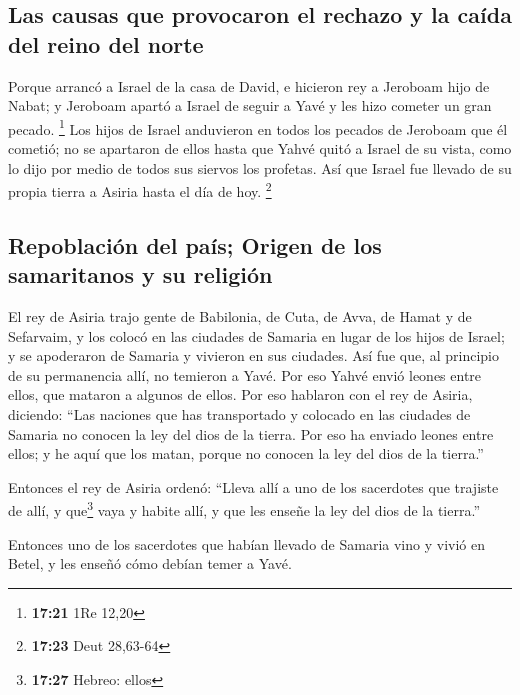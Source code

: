 \begin{paracol}{2}
\hypertarget{las-causas-que-provocaron-el-rechazo-y-la-cauxedda-del-reino-del-norte}{%
\subsection{Las causas que provocaron el rechazo y la caída del reino
del
norte}\label{las-causas-que-provocaron-el-rechazo-y-la-cauxedda-del-reino-del-norte}}

 Porque arrancó a Israel de la casa de David, e hicieron
rey a Jeroboam hijo de Nabat; y Jeroboam apartó a Israel de seguir a
Yavé y les hizo cometer un gran pecado. \footnote{\textbf{17:21} 1Re
  12,20}  Los hijos de Israel anduvieron en todos los
pecados de Jeroboam que él cometió; no se apartaron de ellos
 hasta que Yahvé quitó a Israel de su vista, como lo dijo
por medio de todos sus siervos los profetas. Así que Israel fue llevado
de su propia tierra a Asiria hasta el día de hoy. \footnote{\textbf{17:23}
  Deut 28,63-64}

\hypertarget{repoblaciuxf3n-del-pauxeds-origen-de-los-samaritanos-y-su-religiuxf3n}{%
\subsection{Repoblación del país; Origen de los samaritanos y su
religión}\label{repoblaciuxf3n-del-pauxeds-origen-de-los-samaritanos-y-su-religiuxf3n}}

 El rey de Asiria trajo gente de Babilonia, de Cuta, de
Avva, de Hamat y de Sefarvaim, y los colocó en las ciudades de Samaria
en lugar de los hijos de Israel; y se apoderaron de Samaria y vivieron
en sus ciudades.  Así fue que, al principio de su
permanencia allí, no temieron a Yavé. Por eso Yahvé envió leones entre
ellos, que mataron a algunos de ellos.  Por eso hablaron
con el rey de Asiria, diciendo: ``Las naciones que has transportado y
colocado en las ciudades de Samaria no conocen la ley del dios de la
tierra. Por eso ha enviado leones entre ellos; y he aquí que los matan,
porque no conocen la ley del dios de la tierra.''

 Entonces el rey de Asiria ordenó: ``Lleva allí a uno de
los sacerdotes que trajiste de allí, y que\footnote{\textbf{17:27}
  Hebreo: ellos} vaya y habite allí, y que les enseñe la ley del dios de
la tierra.''

 Entonces uno de los sacerdotes que habían llevado de
Samaria vino y vivió en Betel, y les enseñó cómo debían temer a Yavé.


\end{paracol}
